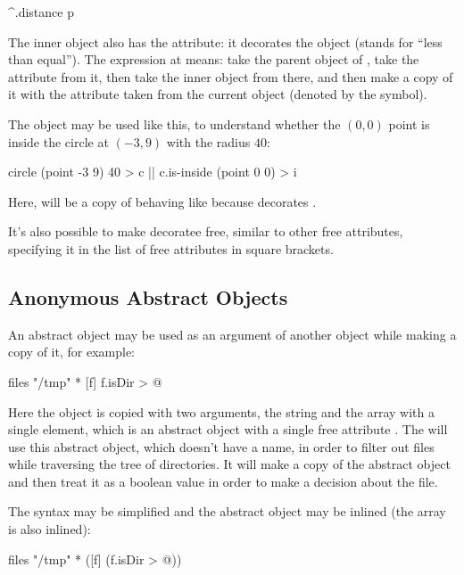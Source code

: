 \begin{ffcode}
^.distance p
\end{ffcode}

The inner object  also has the  attribute: it
decorates the object  (stands for ``less than equal'').
The expression at  means:
take the parent object of ,
take the attribute  from it, then take the inner object 
from there, and then make a copy of it with the attribute 
taken from the current object (denoted by the \ff{\$} symbol).

The object  may be used like this, to understand whether
the $(0,0)$ point is inside the circle at $(-3,9)$ with the radius $40$:

\begin{ffcode}
circle (point -3 9) 40 > c  |$\label{ln:circle-c}$|
c.is-inside (point 0 0) > i
\end{ffcode}

Here,  will be a copy of  behaving like 
because  decorates .

It's also possible to make decoratee free, similar to other free
attributes, specifying it in the list of free attributes in
square brackets.

\subsection{Anonymous Abstract Objects}

An abstract object may be used as an argument of another object while
making a copy of it, for example:

\begin{ffcode}
files
  "/tmp"
  *
    [f]
      f.isDir > @
\end{ffcode}

Here the object  is copied with two arguments, the string
 and the array with a single element, which is an
abstract object with a single free attribute . The 
will use this abstract object, which doesn't have a name, in order
to filter out files while traversing the tree of directories. It will
make a copy of the abstract object and then treat it as a boolean
value in order to make a decision about the file.

The syntax may be simplified and the abstract object may be inlined
(the array is also inlined):

\begin{ffcode}
files
  "/tmp"
  * ([f] (f.isDir > @))
\end{ffcode}

